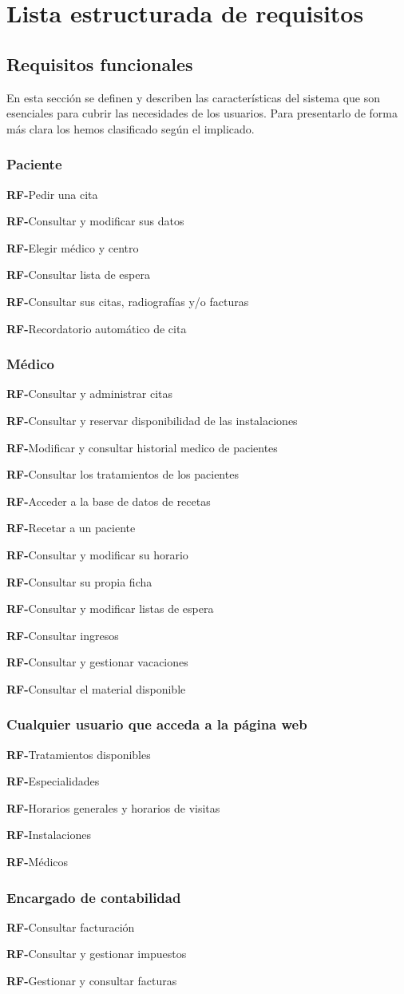 \documentclass[11pt,a4paper]{article}
\newcounter{RFCounter}
\newcommand{\rf}[1]{\addtocounter{RFCounter}{1}\textbf{\rmfamily RF-\theRFCounter}\quad#1\\}
\begin{document}



\section{Lista estructurada de requisitos} %
\label{sec:lista_estructurada_de_requisitos}

\subsection{Requisitos funcionales}
En esta sección se definen y describen las características del sistema que son esenciales para cubrir las necesidades de los usuarios. Para presentarlo de forma más clara los hemos clasificado según el implicado.

\subsubsection{Paciente}
    \rf{Pedir una cita}
    \rf{Consultar y modificar sus datos}
    \rf{Elegir médico y centro}
    \rf{Consultar lista de espera}
    \rf{Consultar sus citas, radiografías y/o facturas}
    \rf{Recordatorio automático de cita}
\subsubsection{Médico}
    \rf{Consultar y administrar citas}
    \rf{Consultar y reservar disponibilidad de las instalaciones}
    \rf{Modificar y consultar historial medico de pacientes}
    \rf{Consultar los tratamientos de los pacientes}
    \rf{Acceder a la base de datos de recetas}
    \rf{Recetar a un paciente}
    \rf{Consultar y modificar su horario}
    \rf{Consultar su propia ficha}
    \rf{Consultar y modificar listas de espera    }
    \rf{Consultar ingresos}
    \rf{Consultar y gestionar vacaciones}
    \rf{Consultar el material disponible}
\subsubsection{Cualquier usuario que acceda a la página web}
    \rf{Tratamientos disponibles}
    \rf{Especialidades}
    \rf{Horarios generales y horarios de visitas}
    \rf{Instalaciones}
    \rf{Médicos}
\subsubsection{Encargado de contabilidad}
    \rf{Consultar facturación}
    \rf{Consultar y gestionar impuestos}
    \rf{Gestionar y consultar facturas}
\end{document}
